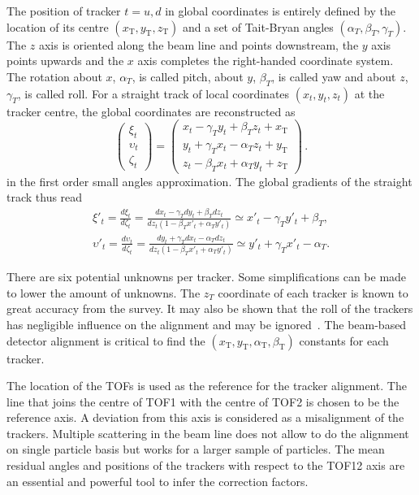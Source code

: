 The position of tracker $t=u,d$ in global coordinates is entirely defined by the location of its centre $(x_\mathrm{T},y_\mathrm{T},z_\mathrm{T})$ and a set of Tait-Bryan angles $(\alpha_T,\beta_T,\gamma_T)$. The $z$ axis is oriented along the beam line and points downstream, the $y$ axis points upwards and the $x$ axis completes the right-handed coordinate system. The rotation about $x$, $\alpha_T$, is called pitch, about $y$, $\beta_T$, is called yaw and about $z$, $\gamma_T$, is called roll. For a straight track of local coordinates $(x_t,y_t,z_t)$ at the tracker centre, the global coordinates are reconstructed as
\begin{equation}
\begin{pmatrix}
\xi_t \\
\upsilon_t \\
\zeta_t  
\end{pmatrix} =
\begin{pmatrix}
x_t-\gamma_T y_t+\beta_T z_t+x_\mathrm{T} \\
y_t+\gamma_T x_t-\alpha_T z_t+y_\mathrm{T} \\
z_t-\beta_T x_t+\alpha_T y_t+z_\mathrm{T}
\end{pmatrix}\, .
\label{eq:rot_matrix}
\end{equation}
in the first order small angles approximation. The global gradients of the straight track thus read
\begin{equation}
\begin{gathered}
\xi'_t = \frac{d\xi_t}{d\zeta_t} = \frac{dx_t-\gamma_Tdy_t+\beta_Tdz_t}{dz_t\left(1-\beta_Tx'_t+\alpha_Ty'_t\right)} \simeq x'_t-\gamma_T y'_t +\beta_T, \\
\upsilon'_t = \frac{d\upsilon_t}{d\zeta_t} = \frac{dy_t+\gamma_Tdx_t-\alpha_Tdz_t}{dz_t\left(1-\beta_Tx'_t+\alpha_Ty'_t\right)} \simeq y'_t+\gamma_T x'_t -\alpha_T.
\end{gathered}
\label{eq:global_grad}
\end{equation}

There are six potential unknowns per tracker. Some simplifications can be made to lower the amount of unknowns. The $z_T$ coordinate of each tracker is known to great accuracy from the survey. It may also be shown that the roll of the trackers has negligible influence on the alignment and may be ignored~\cite{2018arXiv1805.06623T}. The beam-based detector alignment is critical to find the $(x_\mathrm{T}, y_\mathrm{T}, \alpha_\mathrm{T}, \beta_\mathrm{T})$ constants for each tracker.

The location of the TOFs is used as the reference for the tracker alignment. The line that joins the centre of TOF1 with the centre of TOF2 is chosen to be the reference axis. A deviation from this axis is considered as a misalignment of the trackers. Multiple scattering in the beam line does not allow to do the alignment on single particle basis but works for a larger sample of particles. The mean residual angles and positions of the trackers with respect to the TOF12 axis are an essential and powerful tool to infer the correction factors.

